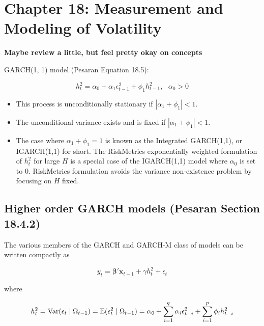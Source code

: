%
%
%
%
%
%

\section{Chapter 18: Measurement and Modeling of Volatility}

\textbf{Maybe review a little, but feel pretty okay on concepts}

GARCH(1, 1) model (Pesaran Equation 18.5):

\begin{equation} \label{ts.eq.18.5}
h_t^2 = \alpha_0 + \alpha_1 \epsilon_{t-1}^2 + \phi_1 h_{t-1}^2, \ \ \ \alpha_0 > 0
\end{equation}

\begin{itemize}
\item This process is unconditionally stationary if \(|\alpha_1 + \phi_1| < 1\). 

\item The unconditional variance exists and is fixed if \(|\alpha_1 + \phi_1| < 1\). 

\item The case where \(\alpha_1 + \phi_1 = 1\) is known as the Integrated GARCH(1,1), or IGARCH(1,1) for short. The RiskMetrics exponentially weighted formulation of \(h_t^2\) for large \(H\) is a special case of the IGARCH(1,1) model where \(\alpha_0\) is set to 0. RiskMetrics formulation avoids the variance non-existence problem by focusing on \(H\) fixed.
\end{itemize}

\subsection{Higher order GARCH models (Pesaran Section 18.4.2)} The various members of the GARCH and GARCH-M class of models can be written compactly as

\begin{equation} \label{ts.eq.18.6}
y_t = \boldsymbol{\beta}' \boldsymbol{x}_{t-1} + \gamma h_t^2 + \epsilon_t
\end{equation}

where

\begin{equation} \label{ts.eq.18.7}
h_t^2 = \mathrm{Var}(\epsilon_t \mid \Omega_{t-1}) = \mathbb{E}(\epsilon_t^2 \mid \Omega_{t-1}) = \alpha_0 + \sum_{i=1}^q \alpha_i \epsilon_{t-i}^2 + \sum_{i=1}^p \phi_i h_{t-i}^2
\end{equation}

